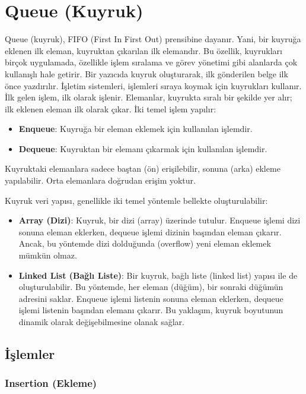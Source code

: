 \section{Queue (Kuyruk)}

Queue (kuyruk), FIFO (First In First Out) prensibine dayanır. Yani, bir kuyruğa eklenen ilk eleman, kuyruktan çıkarılan ilk elemandır. Bu özellik, kuyrukları birçok uygulamada, özellikle işlem sıralama ve görev yönetimi gibi alanlarda çok kullanışlı hale getirir. Bir yazıcıda kuyruk oluşturarak, ilk gönderilen belge ilk önce yazdırılır. İşletim sistemleri, işlemleri sıraya koymak için kuyrukları kullanır. İlk gelen işlem, ilk olarak işlenir. Elemanlar, kuyrukta sıralı bir şekilde yer alır; ilk eklenen eleman ilk olarak çıkar. İki temel işlem yapılır:

\begin{itemize}
    \item \textbf{Enqueue}: Kuyruğa bir eleman eklemek için kullanılan işlemdir.
    \item \textbf{Dequeue}: Kuyruktan bir elemanı çıkarmak için kullanılan işlemdir.
\end{itemize}

Kuyruktaki elemanlara sadece baştan (ön) erişilebilir, sonuna (arka) ekleme yapılabilir. Orta elemanlara doğrudan erişim yoktur.

Kuyruk veri yapısı, genellikle iki temel yöntemle bellekte oluşturulabilir:

\begin{itemize}
    \item \textbf{Array (Dizi)}: Kuyruk, bir dizi (array) üzerinde tutulur. Enqueue işlemi dizi sonuna eleman eklerken, dequeue işlemi dizinin başından eleman çıkarır. Ancak, bu yöntemde dizi dolduğunda (overflow) yeni eleman eklemek mümkün olmaz.
    \item \textbf{Linked List (Bağlı Liste)}: Bir kuyruk, bağlı liste (linked list) yapısı ile de oluşturulabilir. Bu yöntemde, her eleman (düğüm), bir sonraki düğümün adresini saklar. Enqueue işlemi listenin sonuna eleman eklerken, dequeue işlemi listenin başından elemanı çıkarır. Bu yaklaşım, kuyruk boyutunun dinamik olarak değişebilmesine olanak sağlar.
\end{itemize}

\subsection{İşlemler}

\subsubsection{Insertion (Ekleme)}

